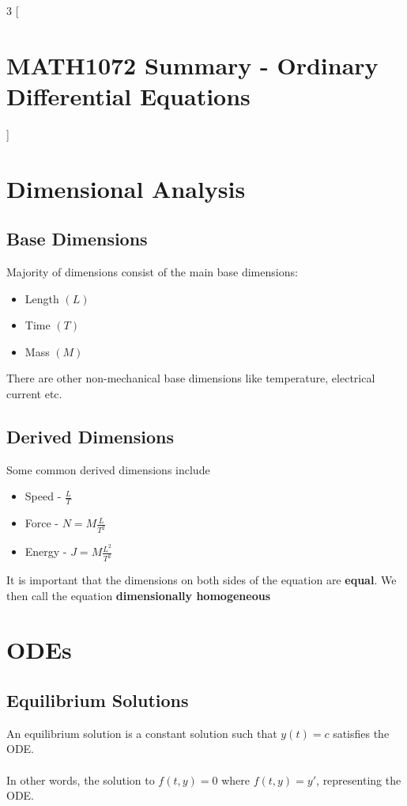 \documentclass{article}
\theoremstyle{remark}
\theoremstyle{definition}
\begin{document}
\begin{landscape}
  \begin{multicols*}{3}
    [
    \section*{MATH1072 Summary - Ordinary Differential Equations}
    ]
 \section*{Dimensional Analysis}
 \subsection*{Base Dimensions}
 Majority of dimensions consist of the main base dimensions:
 \begin{itemize}
   \item Length \( (L) \)
   \item Time \( (T) \)
   \item Mass \( (M) \)
 \end{itemize}
 There are other non-mechanical base dimensions like temperature, electrical
 current etc.
 \subsection*{Derived Dimensions}
 Some common derived dimensions include
 \begin{itemize}
   \item Speed - \( \displaystyle \frac{L}{T} \)
   \item Force - \( N = M \displaystyle \frac{L}{T^2} \)
   \item Energy - \( J = M \displaystyle \frac{L^2}{T^2} \)
 \end{itemize}
 It is important that the dimensions on both sides of the equation are
 \textbf{equal}. We then call the equation \textbf{dimensionally
 homogeneous}

 \section*{ODEs}
 \subsection*{Equilibrium Solutions}
 An equilibrium solution is a constant solution such that \( y(t) = c \)
 satisfies the ODE.\\\\
 In other words, the solution to \( f(t,y) = 0 \) where \( f(t,y) = y'\),
 representing the ODE.

\end{multicols*}
\end{landscape}
\end{document}
